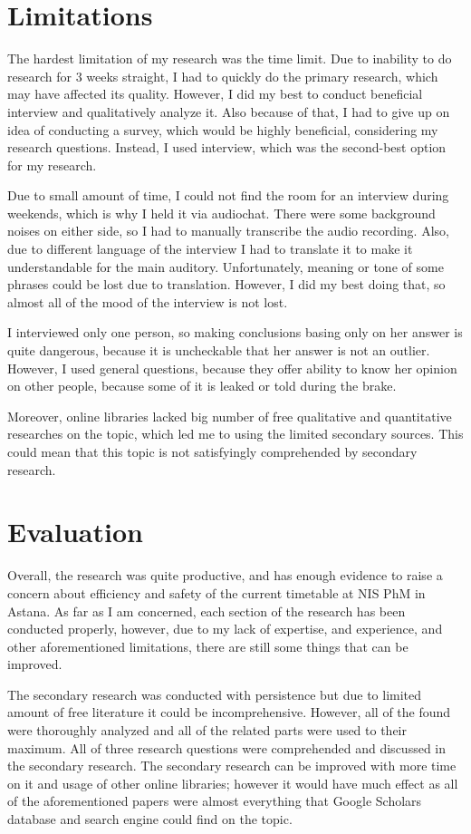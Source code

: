 \documentclass[12pt,a4paper,stu, donotrepeattitle, floatsintext]{apa7}
\begin{document}
\section{Limitations}
The hardest limitation of my research was the time limit. Due to inability to do research for 3 weeks straight, I had to quickly do the primary research, which may have affected its quality. However, I did my best to conduct beneficial interview and qualitatively analyze it. Also because of that, I had to give up on idea of conducting a survey, which would be highly beneficial, considering my research questions. Instead, I used interview, which was the second-best option for my research.
	
Due to small amount of time, I could not find the room for an interview during weekends, which is why I held it via audiochat. There were some background noises on either side, so I had to manually transcribe the audio recording. Also, due to different language of the interview I had to translate it to make it understandable for the main auditory. Unfortunately, meaning or tone of some phrases could be lost due to translation. However, I did my best doing that, so almost all of the mood of the interview is not lost. 

I interviewed only one person, so making conclusions basing only on her answer is quite dangerous, because it is uncheckable that her answer is not an outlier. However, I used general questions, because they offer ability to know her opinion on other people, because some of it is leaked or told during the brake.
	
Moreover, online libraries lacked big number of free qualitative and quantitative researches on the topic, which led me to using the limited secondary sources. This could mean that this topic is not satisfyingly comprehended by secondary research.

\section{Evaluation}
Overall, the research was quite productive, and has enough evidence to raise a concern about efficiency and safety of the current timetable at NIS PhM in Astana. As far as I am concerned, each section of the research has been conducted properly, however, due to my lack of expertise, and experience, and other aforementioned limitations, there are still some things that can be improved.	

The secondary research was conducted with persistence but due to limited amount of free literature it could be incomprehensive. However, all of the found were thoroughly analyzed and all of the related parts were used to their maximum. All of three research questions were comprehended and discussed in the secondary research. The secondary research can be improved with more time on it and usage of other online libraries; however it would have much effect as all of the aforementioned papers were almost everything that Google Scholars database and search engine could find on the topic.
\end{document}
